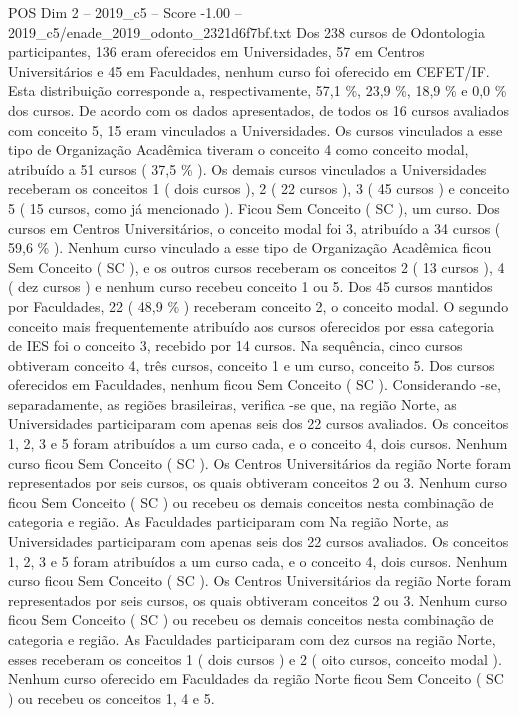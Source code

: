 \begin{textsample}{POS Dim 2 – 2019\_c5 – Score -1.00 – 2019\_c5/enade\_2019\_odonto\_2321d6f7bf.txt}
Dos 238 cursos de Odontologia participantes, 136 eram oferecidos em Universidades, 57 em Centros Universitários e 45 em Faculdades, nenhum curso foi oferecido em CEFET/IF.
Esta distribuição corresponde a, respectivamente, 57,1 \%, 23,9 \%, 18,9 \% e 0,0 \% dos cursos.
De acordo com os dados apresentados, de todos os 16 cursos avaliados com conceito 5, 15 eram vinculados a Universidades.
Os cursos vinculados a esse tipo de Organização Acadêmica tiveram o conceito 4 como conceito modal, atribuído a 51 cursos ( 37,5 \% ).
Os demais cursos vinculados a Universidades receberam os conceitos 1 ( dois cursos ), 2 ( 22 cursos ), 3 ( 45 cursos ) e conceito 5 ( 15 cursos, como já mencionado ).
Ficou Sem Conceito ( SC ), um curso.
Dos cursos em Centros Universitários, o conceito modal foi 3, atribuído a 34 cursos ( 59,6 \% ).
Nenhum curso vinculado a esse tipo de Organização Acadêmica ficou Sem Conceito ( SC ), e os outros cursos receberam os conceitos 2 ( 13 cursos ), 4 ( dez cursos ) e nenhum curso recebeu conceito 1 ou 5.
Dos 45 cursos mantidos por Faculdades, 22 ( 48,9 \% ) receberam conceito 2, o conceito modal.
O segundo conceito mais frequentemente atribuído aos cursos oferecidos por essa categoria de IES foi o conceito 3, recebido por 14 cursos.
Na sequência, cinco cursos obtiveram conceito 4, três cursos, conceito 1 e um curso, conceito 5.
Dos cursos oferecidos em Faculdades, nenhum ficou Sem Conceito ( SC ).
Considerando -se, separadamente, as regiões brasileiras, verifica -se que, na região Norte, as Universidades participaram com apenas seis dos 22 cursos avaliados.
Os conceitos 1, 2, 3 e 5 foram atribuídos a um curso cada, e o conceito 4, dois cursos.
Nenhum curso ficou Sem Conceito ( SC ).
Os Centros Universitários da região Norte foram representados por seis cursos, os quais obtiveram conceitos 2 ou 3.
Nenhum curso ficou Sem Conceito ( SC ) ou recebeu os demais conceitos nesta combinação de categoria e região.
As Faculdades participaram com Na região Norte, as Universidades participaram com apenas seis dos 22 cursos avaliados.
Os conceitos 1, 2, 3 e 5 foram atribuídos a um curso cada, e o conceito 4, dois cursos.
Nenhum curso ficou Sem Conceito ( SC ).
Os Centros Universitários da região Norte foram representados por seis cursos, os quais obtiveram conceitos 2 ou 3.
Nenhum curso ficou Sem Conceito ( SC ) ou recebeu os demais conceitos nesta combinação de categoria e região.
As Faculdades participaram com dez cursos na região Norte, esses receberam os conceitos 1 ( dois cursos ) e 2 ( oito cursos, conceito modal ).
Nenhum curso oferecido em Faculdades da região Norte ficou Sem Conceito ( SC ) ou recebeu os conceitos 1, 4 e 5.

\end{textsample}
